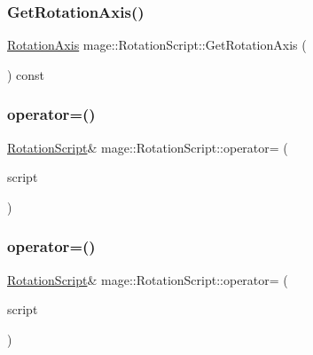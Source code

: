 \subsubsection{\texorpdfstring{Get\+Rotation\+Axis()}{GetRotationAxis()}}
{\footnotesize\ttfamily \hyperlink{classmage_1_1_rotation_script_ad06cf896ce6dfe4f6676b263d15b4ee9}{Rotation\+Axis} mage\+::\+Rotation\+Script\+::\+Get\+Rotation\+Axis (\begin{DoxyParamCaption}{ }\end{DoxyParamCaption}) const\hspace{0.3cm}{\ttfamily [noexcept]}}

\hypertarget{classmage_1_1_rotation_script_a738c666a1aa42412da82d24368b20dfe}{}\label{classmage_1_1_rotation_script_a738c666a1aa42412da82d24368b20dfe} 
\subsubsection{\texorpdfstring{operator=()}{operator=()}\hspace{0.1cm}{\footnotesize\ttfamily [1/2]}}
{\footnotesize\ttfamily \hyperlink{classmage_1_1_rotation_script}{Rotation\+Script}\& mage\+::\+Rotation\+Script\+::operator= (\begin{DoxyParamCaption}\item[{const \hyperlink{classmage_1_1_rotation_script}{Rotation\+Script} \&}]{script }\end{DoxyParamCaption})\hspace{0.3cm}{\ttfamily [delete]}}

\hypertarget{classmage_1_1_rotation_script_a093aa3f50dcbbe68847bb0b5f6363e7a}{}\label{classmage_1_1_rotation_script_a093aa3f50dcbbe68847bb0b5f6363e7a} 
\subsubsection{\texorpdfstring{operator=()}{operator=()}\hspace{0.1cm}{\footnotesize\ttfamily [2/2]}}
{\footnotesize\ttfamily \hyperlink{classmage_1_1_rotation_script}{Rotation\+Script}\& mage\+::\+Rotation\+Script\+::operator= (\begin{DoxyParamCaption}\item[{\hyperlink{classmage_1_1_rotation_script}{Rotation\+Script} \&\&}]{script }\end{DoxyParamCaption})\hspace{0.3cm}{\ttfamily [delete]}}

